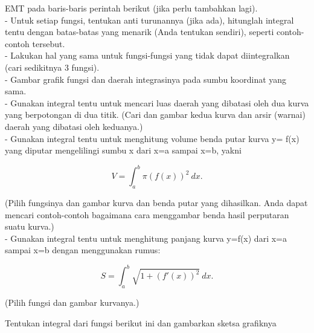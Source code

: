 \documentclass{article}
\begin{document}
\begin{eulernotebook}
\begin{eulercomment}
\begin{eulercomment}
\begin{eulercomment}
\begin{eulercomment}
\begin{eulercomment}
\begin{eulercomment}
\begin{eulercomment}
EMT pada baris-baris perintah berikut (jika perlu tambahkan lagi).\\
- Untuk setiap fungsi, tentukan anti turunannya (jika ada), hitunglah
integral tentu dengan batas-batas yang menarik (Anda tentukan
sendiri), seperti contoh-contoh tersebut.\\
- Lakukan hal yang sama untuk fungsi-fungsi yang tidak dapat
diintegralkan (cari sedikitnya 3 fungsi).\\
- Gambar grafik fungsi dan daerah integrasinya pada sumbu koordinat
yang sama.\\
- Gunakan integral tentu untuk mencari luas daerah yang dibatasi oleh
dua kurva yang berpotongan di dua titik. (Cari dan gambar kedua kurva
dan arsir (warnai) daerah yang dibatasi oleh keduanya.)\\
- Gunakan integral tentu untuk menghitung volume benda putar kurva y=
f(x) yang diputar mengelilingi sumbu x dari x=a sampai x=b, yakni

\end{eulercomment}
\begin{eulerformula}
\[
V = \int_a^b \pi (f(x))^2\ dx.
\]
\end{eulerformula}
\begin{eulercomment}
(Pilih fungsinya dan gambar kurva dan benda putar yang dihasilkan.
Anda dapat mencari contoh-contoh bagaimana cara menggambar benda hasil
perputaran suatu kurva.)\\
- Gunakan integral tentu untuk menghitung panjang kurva y=f(x) dari
x=a sampai x=b dengan menggunakan rumus:

\end{eulercomment}
\begin{eulerformula}
\[
S = \int_a^b \sqrt{1+(f'(x))^2} \ dx.
\]
\end{eulerformula}
\begin{eulercomment}
(Pilih fungsi dan gambar kurvanya.)

\end{eulercomment}
\eulersubheading{}
\begin{eulercomment}
Tentukan integral dari fungsi berikut ini dan gambarkan sketsa
grafiknya


\end{eulercomment}
\end{eulercomment}
\end{eulercomment}
\end{eulercomment}
\end{eulercomment}
\end{eulercomment}
\end{eulercomment}
\end{eulernotebook}
\end{document}
